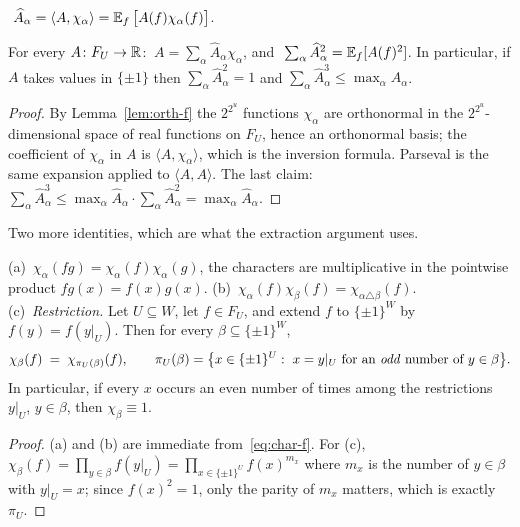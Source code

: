 \begin{definition}\label{def:fourier-f}
$\ \widehat A_\alpha=\langle A,\chi_\alpha\rangle=\operatorname*{\mathbb{E}}_f\big[A(f)\chi_\alpha(f)\big]$.
\end{definition}

\begin{theorem}\label{thm:inv-f}
For every $A\colon F_U\to\mathbb{R}$: $\ A=\sum_\alpha\widehat A_\alpha\chi_\alpha$, and $\ \sum_\alpha\widehat A_\alpha^2=\operatorname*{\mathbb{E}}_f[A(f)^2]$.
In particular, if $A$ takes values in $\{\pm1\}$ then $\sum_\alpha\widehat A_\alpha^2=1$ and $\sum_\alpha\widehat A_\alpha^3\le\max_\alpha\widehat A_\alpha$.
\end{theorem}
\begin{proof}
By Lemma~\ref{lem:orth-f} the $2^{2^u}$ functions $\chi_\alpha$ are orthonormal in the $2^{2^u}$-dimensional space of real functions on $F_U$, hence an orthonormal basis; the coefficient of $\chi_\alpha$ in $A$ is $\langle A,\chi_\alpha\rangle$, which is the inversion formula.
Parseval is the same expansion applied to $\langle A,A\rangle$.
The last claim: $\sum_\alpha\widehat A_\alpha^3\le\max_\alpha\widehat A_\alpha\cdot\sum_\alpha\widehat A_\alpha^2=\max_\alpha\widehat A_\alpha$.
\end{proof}

\noindent
Two more identities, which are what the extraction argument uses.

\begin{lemma}\label{lem:prod-f}
(a)~$\chi_\alpha(fg)=\chi_\alpha(f)\chi_\alpha(g)$, \ie the characters are multiplicative in the pointwise product $fg(x)=f(x)g(x)$.
(b)~$\chi_\alpha(f)\chi_\beta(f)=\chi_{\alpha\triangle\beta}(f)$.
(c)~\emph{Restriction.}  Let $U\subseteq W$, let $f\in F_U$, and extend $f$ to $\{\pm1\}^W$ by $f(y)=f(y|_U)$.  Then for every $\beta\subseteq\{\pm1\}^W$,
\[
  \chi_\beta(f)\;=\;\chi_{\pi_U(\beta)}(f),\qquad
  \pi_U(\beta)=\big\{x\in\{\pm1\}^U:\ x=y|_U\text{ for an \emph{odd} number of }y\in\beta\big\}.
\]
In particular, if every $x$ occurs an even number of times among the restrictions $y|_U$, $y\in\beta$, then $\chi_\beta\equiv1$.
\end{lemma}
\begin{proof}
(a) and (b) are immediate from~\eqref{eq:char-f}.  For (c), $\chi_\beta(f)=\prod_{y\in\beta}f(y|_U)=\prod_{x\in\{\pm1\}^U}f(x)^{m_x}$ where $m_x$ is the number of $y\in\beta$ with $y|_U=x$; since $f(x)^2=1$, only the parity of $m_x$ matters, which is exactly $\pi_U$.
\end{proof}

